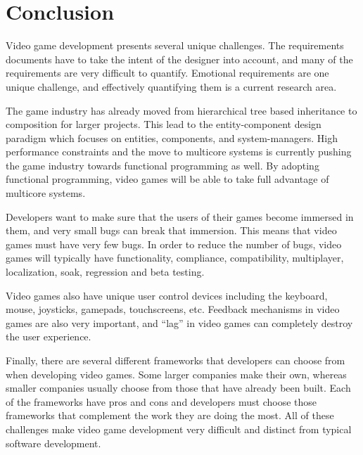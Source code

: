 \section{Conclusion}
Video game development presents several unique challenges. The requirements documents have to take the intent of the designer into account, and many of the requirements are very difficult to quantify. Emotional requirements are one unique challenge, and effectively quantifying them is a current research area. 

The game industry has already moved from hierarchical tree based inheritance to composition for larger projects. This lead to the entity-component design paradigm which focuses on entities, components, and system-managers. High performance constraints and the move to multicore systems is currently pushing the game industry towards functional programming as well. By adopting functional programming, video games will be able to take full advantage of multicore systems.

Developers want to make sure that the users of their games become immersed in them, and very small bugs can break that immersion. This means that video games must have very few bugs. In order to reduce the number of bugs, video games will typically have functionality, compliance, compatibility, multiplayer, localization, soak, regression and beta testing.

Video games also have unique user control devices including the keyboard, mouse, joysticks, gamepads, touchscreens, etc. Feedback mechanisms in video games are also very important, and ``lag'' in video games can completely destroy the user experience. 

Finally, there are several different frameworks that developers can choose from when developing video games. Some larger companies make their own, whereas smaller companies usually choose from those that have already been built. Each of the frameworks have pros and cons and developers must choose those frameworks that complement the work they are doing the most. All of these challenges make video game development very difficult and distinct from typical software development.
